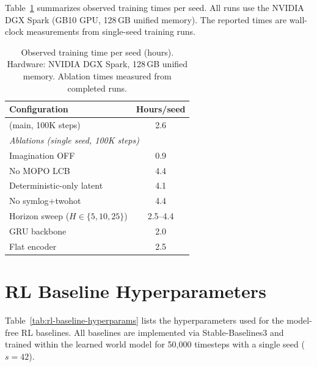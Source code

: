 Table~\ref{tab:compute} summarizes observed training times per seed. All runs use the NVIDIA DGX Spark (GB10 GPU, 128\,GB unified memory). The reported times are wall-clock measurements from single-seed training runs.

\begin{table}[h]
\centering
\caption{Observed training time per seed (hours). Hardware: NVIDIA DGX Spark, 128\,GB unified memory. Ablation times measured from completed runs.}
\label{tab:compute}
\begin{tabular}{@{}lc@{}}
\toprule
\textbf{Configuration} & \textbf{Hours/seed} \\
\midrule
\dreamprice{} (main, 100K steps) & 2.6 \\
\midrule
\multicolumn{2}{l}{\textit{Ablations (single seed, 100K steps)}} \\
Imagination OFF & 0.9 \\
No MOPO LCB & 4.4 \\
Deterministic-only latent & 4.1 \\
No symlog+twohot & 4.4 \\
Horizon sweep ($H \in \{5, 10, 25\}$) & 2.5--4.4 \\
GRU backbone & 2.0 \\
Flat encoder & 2.5 \\
\bottomrule
\end{tabular}
\end{table}

\section{RL Baseline Hyperparameters}
\label{app:rl-baselines}

Table~\ref{tab:rl-baseline-hyperparams} lists the hyperparameters used for the model-free RL baselines. All baselines are implemented via Stable-Baselines3 \citep{raffin2021sb3} and trained within the learned \dreamprice{} world model for 50{,}000 timesteps with a single seed ($s = 42$).

